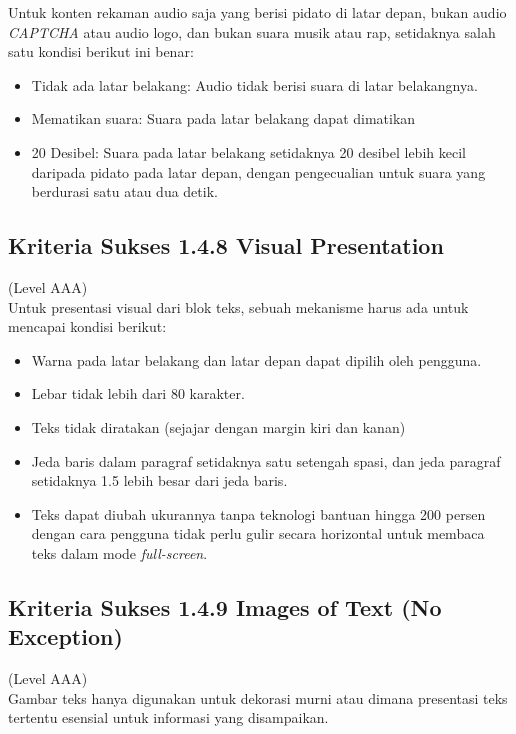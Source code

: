 Untuk konten rekaman audio saja yang berisi pidato di latar depan, bukan audio \textit{CAPTCHA} atau audio logo, dan bukan suara musik atau rap, setidaknya salah satu kondisi berikut ini benar: 

\begin{itemize}
	\item Tidak ada latar belakang: Audio tidak berisi suara di latar belakangnya.
	\item Mematikan suara: Suara pada latar belakang dapat dimatikan
	\item 20 Desibel: Suara pada latar belakang setidaknya 20 desibel lebih kecil daripada pidato pada latar depan, dengan pengecualian untuk suara yang berdurasi satu atau dua detik.
\end{itemize}

\subsection{Kriteria Sukses 1.4.8 Visual Presentation}
\label{subsec:kriteria_1.4.8}
(Level AAA) \\

Untuk presentasi visual dari blok teks, sebuah mekanisme harus ada untuk mencapai kondisi berikut:

\begin{itemize}
	\item Warna pada latar belakang dan latar depan dapat dipilih oleh pengguna.
	\item Lebar tidak lebih dari 80 karakter.
	\item Teks tidak diratakan (sejajar dengan margin kiri dan kanan)
	\item Jeda baris dalam paragraf setidaknya satu setengah spasi, dan jeda paragraf setidaknya 1.5 lebih besar dari jeda baris.
	\item Teks dapat diubah ukurannya tanpa teknologi bantuan hingga 200 persen dengan cara pengguna tidak perlu gulir secara horizontal untuk membaca teks dalam mode \textit{full-screen}.
\end{itemize}

\subsection{Kriteria Sukses 1.4.9 Images of Text (No Exception)}
\label{subsec:kriteria_1.4.9}
(Level AAA) \\

Gambar teks hanya digunakan untuk dekorasi murni atau dimana presentasi teks tertentu esensial untuk informasi yang disampaikan. 

